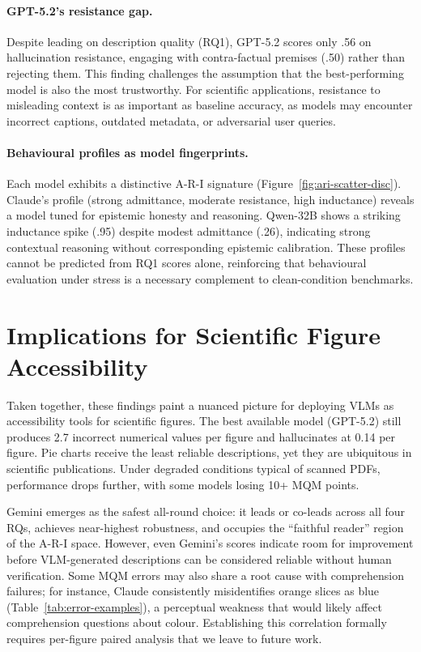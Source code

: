\paragraph{GPT-5.2's resistance gap.}
Despite leading on description quality (RQ1), GPT-5.2 scores only .56 on hallucination resistance, engaging with contra-factual premises (.50) rather than rejecting them.
This finding challenges the assumption that the best-performing model is also the most trustworthy.
For scientific applications, resistance to misleading context is as important as baseline accuracy, as models may encounter incorrect captions, outdated metadata, or adversarial user queries.

\paragraph{Behavioural profiles as model fingerprints.}
Each model exhibits a distinctive A-R-I signature (Figure~\ref{fig:ari-scatter-disc}).
Claude's profile (strong admittance, moderate resistance, high inductance) reveals a model tuned for epistemic honesty and reasoning.
Qwen-32B shows a striking inductance spike (.95) despite modest admittance (.26), indicating strong contextual reasoning without corresponding epistemic calibration.
These profiles cannot be predicted from RQ1 scores alone, reinforcing that behavioural evaluation under stress is a necessary complement to clean-condition benchmarks.

\section{Implications for Scientific Figure Accessibility}\label{sec:disc-accessibility}

Taken together, these findings paint a nuanced picture for deploying VLMs as accessibility tools for scientific figures.
The best available model (GPT-5.2) still produces 2.7 incorrect numerical values per figure and hallucinates at 0.14 per figure.
Pie charts receive the least reliable descriptions, yet they are ubiquitous in scientific publications.
Under degraded conditions typical of scanned PDFs, performance drops further, with some models losing 10+ MQM points.

Gemini emerges as the safest all-round choice: it leads or co-leads across all four RQs, achieves near-highest robustness, and occupies the ``faithful reader'' region of the A-R-I space.
However, even Gemini's scores indicate room for improvement before VLM-generated descriptions can be considered reliable without human verification.
Some MQM errors may also share a root cause with comprehension failures; for instance, Claude consistently misidentifies orange slices as blue (Table~\ref{tab:error-examples}), a perceptual weakness that would likely affect comprehension questions about colour.
Establishing this correlation formally requires per-figure paired analysis that we leave to future work.

